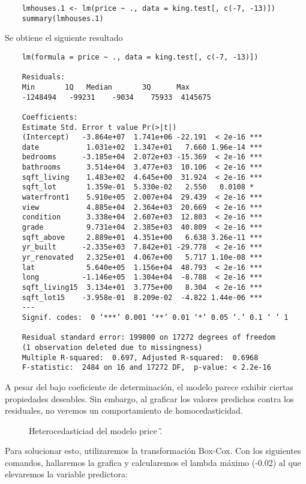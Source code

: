 \documentclass[10pt,letterpaper]{article}
\begin{document}
\begin{verbatim}
	lmhouses.1 <- lm(price ~ ., data = king.test[, c(-7, -13)])
	summary(lmhouses.1)
\end{verbatim}

Se obtiene el siguiente resultado

\begin{verbatim}
	lm(formula = price ~ ., data = king.test[, c(-7, -13)])
	
	Residuals:
	Min       1Q   Median       3Q      Max 
	-1248494   -99231    -9034    75933  4145675 
	
	Coefficients:
	Estimate Std. Error t value Pr(>|t|)    
	(Intercept)   -3.864e+07  1.741e+06 -22.191  < 2e-16 ***
	date           1.031e+02  1.347e+01   7.660 1.96e-14 ***
	bedrooms      -3.185e+04  2.072e+03 -15.369  < 2e-16 ***
	bathrooms      3.514e+04  3.477e+03  10.106  < 2e-16 ***
	sqft_living    1.483e+02  4.645e+00  31.924  < 2e-16 ***
	sqft_lot       1.359e-01  5.330e-02   2.550   0.0108 *  
	waterfront1    5.910e+05  2.007e+04  29.439  < 2e-16 ***
	view           4.885e+04  2.364e+03  20.669  < 2e-16 ***
	condition      3.338e+04  2.607e+03  12.803  < 2e-16 ***
	grade          9.731e+04  2.385e+03  40.809  < 2e-16 ***
	sqft_above     2.889e+01  4.351e+00   6.638 3.26e-11 ***
	yr_built      -2.335e+03  7.842e+01 -29.778  < 2e-16 ***
	yr_renovated   2.325e+01  4.067e+00   5.717 1.10e-08 ***
	lat            5.640e+05  1.156e+04  48.793  < 2e-16 ***
	long          -1.146e+05  1.304e+04  -8.788  < 2e-16 ***
	sqft_living15  3.134e+01  3.775e+00   8.304  < 2e-16 ***
	sqft_lot15    -3.958e-01  8.209e-02  -4.822 1.44e-06 ***
	---
	Signif. codes:  0 ‘***’ 0.001 ‘**’ 0.01 ‘*’ 0.05 ‘.’ 0.1 ‘ ’ 1
	
	Residual standard error: 199800 on 17272 degrees of freedom
	(1 observation deleted due to missingness)
	Multiple R-squared:  0.697,	Adjusted R-squared:  0.6968 
	F-statistic:  2484 on 16 and 17272 DF,  p-value: < 2.2e-16
\end{verbatim}

A pesar del bajo coeficiente de determinación, el modelo parece exhibir ciertas propiedades deseables. Sin embargo, al graficar los valores predichos contra los residuales, no veremos un comportamiento de homocedasticidad.

\begin{figure}[h!]
	\caption{Heterocedasticiad del modelo price \~ .}
\end{figure}

Para solucionar esto, utilizaremos la transformación Box-Cox. Con los siguientes comandos, hallaremos la grafica y calcularemos el lambda máximo (-0.02) al que elevaremos la variable predictora:
\end{document}
